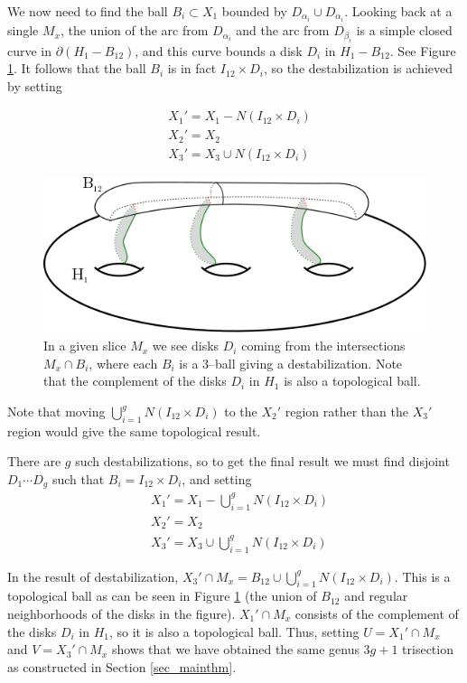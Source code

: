 \documentclass[12pt]{amsart}
\newcommand{\del}{\partial }
\theoremstyle{definition}
\theoremstyle{remark}
\begin{document}
We now need to find the ball $B_i \subset X_1$ bounded by $D_{\alpha_i} \cup D_{\alpha_i}$.
Looking back at a single $M_x$, the union of the arc from $D_{\alpha_i}$ and the arc from $D_{\beta_i}$ is a simple closed curve in $\del (H_1 - B_{12})$, and this curve bounds a disk $D_i$ in $H_1 - B_{12}$.
See Figure \ref{getU}.
It follows that the ball $B_i$ is in fact $I_{12} \times D_i$, so the destabilization is achieved by setting

\begin{align*}
&X_1' = X_1 - N(I_{12} \times D_i) \\
&X_2' = X_2\\
&X_3' = X_3 \cup N(I_{12} \times D_i)
\end{align*}

\begin{figure}[h]
\centering
\includegraphics[height=1.8in]{gettingU.png}
\caption{In a given slice $M_x$ we see disks $D_i$ coming from the intersections $M_x \cap B_i$, where each $B_i$ is a 3--ball giving a destabilization.
Note that the complement of the disks $D_i$ in $H_1$ is also a topological ball.
}
\label{getU}
\end{figure}

Note that moving $\bigcup_{i=1}^g N(I_{12} \times D_i)$ to the $X_2'$ region rather than the $X_3'$ region would give the same topological result.

There are $g$ such destabilizations, so to get the final result we must find disjoint $D_1 \cdots D_g$ such that $B_i = I_{12} \times D_i$, and setting
\begin{align*}
&X_1' = X_1 - \bigcup_{i=1}^g N(I_{12} \times D_i) \\
&X_2' = X_2\\
&X_3' = X_3 \cup \bigcup_{i=1}^g N(I_{12} \times D_i)
\end{align*}

In the result of destabilization, $X_3' \cap M_x = B_{12} \cup \bigcup_{i=1}^g N(I_{12} \times D_i)$.
This is a topological ball as can be seen in Figure \ref{getU} (the union of $B_{12}$ and regular neighborhoods of the disks in the figure).
$X_1' \cap M_x$ consists of the complement of the disks $D_i$ in $H_1$, so it is also a topological ball.
Thus, setting $U=X_1' \cap M_x$ and $V = X_3' \cap M_x$ shows that we have obtained the same genus $3g+1$ trisection as constructed in Section \ref{sec_mainthm}.
\end{document}
